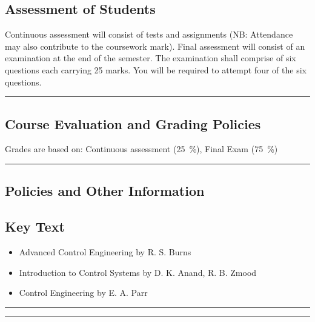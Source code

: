 \subsection*{Assessment of Students}
\begin{outline}
    \1 Continuous assessment will consist of tests and assignments (NB: Attendance may also contribute to the coursework mark).
    \1 Final assessment will consist of an examination at the end of the semester. The examination shall comprise of six questions each carrying 25 marks. You will be required to attempt four of the six questions.
\end{outline}
\vspace{2ex}\hrule\vspace{2ex}

\subsection*{Course Evaluation and Grading Policies}
Grades are based on:
Continuous assessment (\qty{25}{\percent}),
Final Exam (\qty{75}{\percent})
\vspace{2ex}\hrule\vspace{2ex}


\subsection*{Policies and Other Information}
\subsection*{Key Text}

\begin{itemize}
    \item Advanced Control Engineering by R. S. Burns
    \item Introduction to Control Systems by D. K. Anand, R. B. Zmood
    \item Control Engineering by E. A. Parr
\end{itemize}
\vspace{2ex}\hrule
\vspace{2ex}\hrule\vspace{2ex}